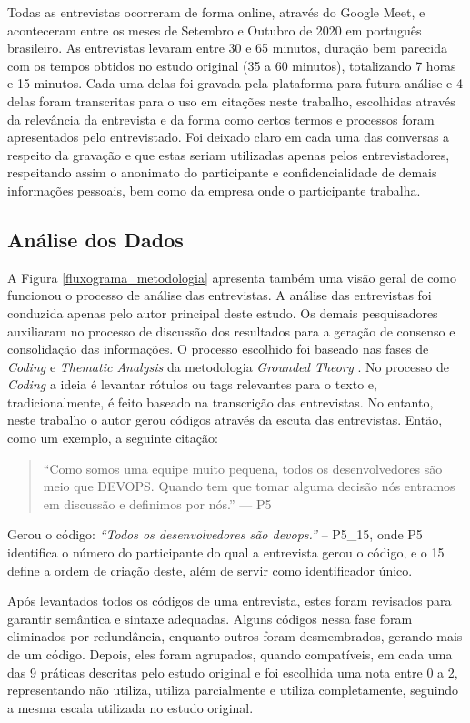 Todas as entrevistas ocorreram de forma online, através do Google Meet, e aconteceram entre os meses de Setembro e Outubro de 2020 em português brasileiro. As entrevistas levaram entre 30 e 65 minutos, duração bem parecida com os tempos obtidos no estudo original (35 a 60 minutos), totalizando 7 horas e 15 minutos. Cada uma delas foi gravada pela plataforma para futura análise e 4 delas foram transcritas para o uso em citações neste trabalho, escolhidas através da relevância da entrevista e da forma como certos termos e processos foram apresentados pelo entrevistado. Foi deixado claro em cada uma das conversas a respeito da gravação e que estas seriam utilizadas apenas pelos entrevistadores, respeitando assim o anonimato do participante e confidencialidade de demais informações pessoais, bem como da empresa onde o participante trabalha.

\subsection{Análise dos Dados}
    
A Figura \ref{fluxograma_metodologia} apresenta também uma visão geral de como funcionou o processo de análise das entrevistas. A análise das entrevistas foi conduzida apenas pelo autor principal deste estudo. Os demais pesquisadores auxiliaram no processo de discussão dos resultados para a geração de consenso e consolidação das informações. O processo escolhido foi baseado nas fases de \emph{Coding} e \emph{Thematic Analysis} da metodologia \emph{Grounded Theory} \cite{groundedTheory}. No processo de \emph{Coding} a ideia é levantar rótulos ou tags relevantes para o texto e, tradicionalmente, é feito baseado na transcrição das entrevistas. No entanto, neste trabalho o autor gerou códigos através da escuta das entrevistas. Então, como um exemplo, a seguinte citação:

\begin{quote}
    ``Como somos uma equipe muito pequena, todos os desenvolvedores são meio que DEVOPS. Quando tem que tomar alguma decisão nós entramos em discussão e definimos por nós.'' --- P5
\end{quote}

Gerou o código: \emph{``Todos os desenvolvedores são devops.''} -- P5\_15, onde P5 identifica o número do participante do qual a entrevista gerou o código, e o 15 define a ordem de criação deste, além de servir como identificador único.

Após levantados todos os códigos de uma entrevista, estes foram revisados para garantir semântica e sintaxe adequadas. Alguns códigos nessa fase foram eliminados por redundância, enquanto outros foram desmembrados, gerando mais de um código. Depois, eles foram agrupados, quando compatíveis, em cada uma das 9 práticas descritas pelo estudo original e foi escolhida uma nota entre 0 a 2, representando não utiliza, utiliza parcialmente e utiliza completamente, seguindo a mesma escala utilizada no estudo original. 


